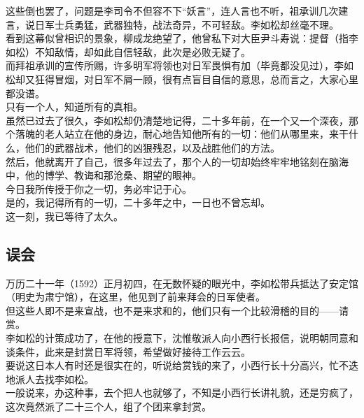 \begin{multicols}{\theparacolNo}
这些倒也罢了，问题是李司令不但容不下“妖言”，连人言也不听，祖承训几次建言，说日军士兵勇猛，武器独特，战法奇异，不可轻敌。李如松却丝毫不理。\\

看到这幕似曾相识的景象，柳成龙绝望了，他曾私下对大臣尹斗寿说：提督（指李如松）不知敌情，却如此自信轻敌，此次是必败无疑了。\\

而拜祖承训的宣传所赐，许多明军将领也对日军畏惧有加（毕竟都没见过），李如松却又狂得冒烟，对日军不屑一顾，很有点盲目自信的意思，总而言之，大家心里都没谱。\\

只有一个人，知道所有的真相。\\

虽然已过去了很久，李如松却仍清楚地记得，二十多年前，在一个又一个深夜，那个落魄的老人站立在他的身边，耐心地告知他所有的一切：他们从哪里来，来干什么，他们的武器战术，他们的凶狠残忍，以及战胜他们的方法。\\

然后，他就离开了自己，很多年过去了，那个人的一切却始终牢牢地铭刻在脑海中，他的博学、教诲和那沧桑、期望的眼神。\\

今日我所传授于你之一切，务必牢记于心。\\

是的，我记得所有的一切，二十多年之中，一日也不曾忘却。\\

这一刻，我已等待了太久。\\

\subsection{误会}
万历二十一年（1592）正月初四，在无数怀疑的眼光中，李如松带兵抵达了安定馆（明史为肃宁馆），在这里，他见到了前来拜会的日军使者。\\

但这些人即不是来宣战，也不是来求和的，他们只有一个比较滑稽的目的——请赏。\\

李如松的计策成功了，在他的授意下，沈惟敬派人向小西行长报信，说明朝同意和谈条件，此来是封赏日军将领，希望做好接待工作云云。\\

要说这日本人有时还是很实在的，听说给赏钱的来了，小西行长十分高兴，忙不迭地派人去找李如松。\\

一般说来，办这种事，去个把人也就够了，不知是小西行长讲礼貌，还是穷疯了，这次竟然派了二十三个人，组了个团来拿封赏。\\


\end{multicols}
